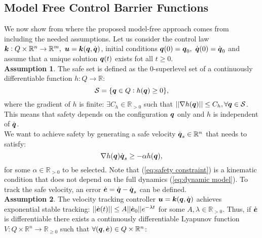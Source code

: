 \subsection{Model Free Control Barrier Functions}
We now show from where the proposed model-free approach comes from including the needed assumptions. Let us consider the control law $ \boldsymbol{k}:Q\times \mathbb{R}^n \rightarrow \mathbb{R}^m,~\boldsymbol{u}=\boldsymbol{k}({\boldsymbol{q}},\dot{\boldsymbol{q}})$, initial conditions ${\boldsymbol{q}}(0) = {\boldsymbol{q}}_0,~\dot{{\boldsymbol{q}}}(0)=\dot{{\boldsymbol{q}}}_0$ and assume that a unique solution ${\boldsymbol{q}}(t)$ exists fot all $t \geq 0$. 
\\
\textbf{Assumption 1}. The safe set is defined as the 0-superlevel set of a continuously differentiable function $h: Q \rightarrow \mathbb{R}$:
\begin{equation} \label{eq:safe set}
    \mathcal{S} = \{{\boldsymbol{q}} \in Q: h({\boldsymbol{q}})\geq 0 \},
\end{equation}
where the gradient of $h$ is finite: $\exists C_h \in \mathbb{R}_{>0}$ such that $|| \nabla h({\boldsymbol{q}})|| \leq C_h, \forall {\boldsymbol{q}} \in \mathcal{S}$. This means that safety depends on the configuration ${\boldsymbol{q}}$ only and $h$ is independent of $\dot{{\boldsymbol{q}}}$.
\\
We want to achieve safety by generating a safe velocity $\dot{{\boldsymbol{q}}}_s \in \mathbb{R}^n$ that needs to satisfy:
\begin{equation} \label{eq:safety constraint}
    \nabla h({\boldsymbol{q}})\dot{\boldsymbol{q}}_s \geq -\alpha h({\boldsymbol{q}}),
\end{equation}
for some $\alpha \in \mathbb{R}_{>0}$ to be selected. Note that (\ref{eq:safety constraint}) is a kinematic condition that does not depend on the full dynamics (\ref{eq:dynamic model}).
To track the safe velocity, an error $\dot{\boldsymbol{e}} = \dot{{\boldsymbol{q}}}-\dot{{\boldsymbol{q}}}_s$ can be defined. \\
\textbf{Assumption 2}. The velocity tracking controller $\boldsymbol{u} = \boldsymbol{k}({\boldsymbol{q}},\dot{\boldsymbol{q}})$ achieves exponential stable tracking: $||\dot{\boldsymbol{e}}(t)||\leq A ||\dot{\boldsymbol{e}}_0|| e^{-\lambda t}$ for some $A,\lambda \in \mathbb{R}_{>0}$.
 Thus, if $\dot{\boldsymbol{e}}$ is differentiable there exists a continuously differentiable Lyapunov function $V: Q \times \mathbb{R}^n \rightarrow \mathbb{R}_{\geq 0}$ such that $\forall({\boldsymbol{q}},\dot{\boldsymbol{e}})\in Q \times \mathbb{R}^n$:
